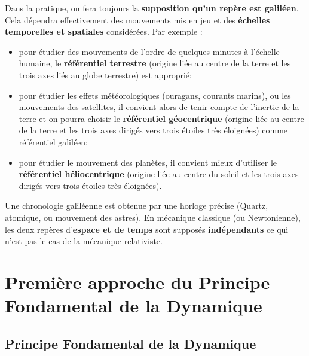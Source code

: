 \begin{rem}
Dans la pratique, on fera toujours la \textbf{supposition qu'un repère est galiléen}. Cela dépendra effectivement des mouvements mis en jeu et des \textbf{échelles temporelles et spatiales} considérées. 
Par exemple :
\begin{itemize}
\item pour étudier des mouvements de l'ordre de quelques minutes à l'échelle humaine, le \textbf{référentiel terrestre} (origine liée au centre de la terre et les trois axes liés au globe terrestre) est approprié;
\item pour étudier les effets météorologiques (ouragans, courants marins), ou les mouvements des satellites, il convient alors de tenir compte de l'inertie de la terre et on pourra choisir le \textbf{référentiel géocentrique} (origine liée au centre de la terre et les trois axes dirigés vers trois étoiles très éloignées) comme référentiel galiléen;
\item pour étudier le mouvement des planètes, il convient mieux d'utiliser le \textbf{référentiel héliocentrique} (origine liée au centre du soleil et les trois axes dirigés vers trois étoiles très éloignées).
\end{itemize}

Une chronologie galiléenne est obtenue par une horloge précise (Quartz, atomique, ou mouvement des astres).
En mécanique classique (ou Newtonienne), les deux repères d'\textbf{espace et de temps} sont supposés \textbf{indépendants} ce qui n'est pas le cas de la mécanique relativiste. 
\end{rem}



\section[PFD : cas général]{Première approche du Principe Fondamental de la Dynamique}

\subsection{Principe Fondamental de la Dynamique}

